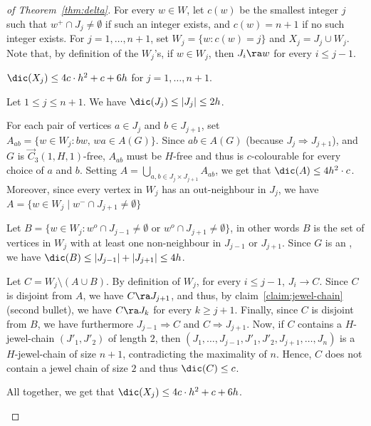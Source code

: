 \begin{proof}[of Theorem~\ref{thm:delta}]
For every $w \in W$, let $c(w)$ be the smallest integer $j$ such that $w^+\cap J_j \neq\emptyset$ if such an integer exists, and $c(w)=n+1$ if no such integer exists. 
For $j=1, \dots, n+1$, set $W_j = \{w:  c(w)=j\}$ and $X_j = J_j \cup W_j$. 
Note that, by definition of the $W_j$'s, if $w \in W_j$, then $J_i \ra w$ for every $i \leq j-1$. 
\vspace{0.3cm}

\begin{claim}\label{claim:X}
$\dic(X_j) \leq  4c \cdot h^2+ c + 6h $ for $j=1, \dots, n+1$. 
\end{claim}

\begin{subproof}
Let $1 \leq j \leq n+1$.
We have $\dic(J_j) \leq |J_j| \leq  2h$.  

 For each pair of vertices $a \in J_{j}$ and $b \in J_{j+1}$, 
set $A_{ab} = \{w \in W_j: bw, \, wa \in A(G)\}$. Since $ab \in A(G)$ (because $J_j \Rightarrow J_{j+1}$), and $G$ is $\vec C_{3}(1, H, 1)$-free, $A_{ab}$ must be $H$-free and thus is $c$-colourable for every choice of $a$ and $b$. 
Setting $A = \bigcup_{a,b \in J_j\times J_{j+1}} A_{ab}$, we get that $\dic(A) \leq 4 h^2 \cdot c$. Moreover, since every vertex in $W_j$ has an out-neighbour in $J_j$, we have $A = \{w \in W_j \mid w^- \cap J_{j+1} \neq \emptyset \}$


Let $B = \{w \in W_j: w^o \cap J_{j-1} \neq \emptyset \text{ or }w^o \cap J_{j+1} \neq \emptyset \}$, in other words $B$ is the set of vertices in $W_j$ with at least one non-neighbour in $J_{j-1}$ or $J_{j+1}$. Since $G$ is an \omg, we have $\dic(B) \leq |J_{j-1}| + |J_{j+1}| \leq  4h$. 

Let $C = W_j \setminus (A \cup B)$. By definition of $W_j$, for every $i \leq j-1$, $J_i \rightarrow C$. 
Since $C$ is disjoint from $A$, we have $C \ra J_{j+1}$, and thus, by claim~\ref{claim:jewel-chain} (second bullet), we have $C \ra J_k$ for every $k \geq j+1$. 
Finally, since $C$ is disjoint from $B$, we have furthermore $J_{j-1} \Rightarrow C$ and $C \Rightarrow J_{j+1}$.  
Now, if $C$ contains a $H$-jewel-chain $(J'_1,J'_2)$ of length $2$, then $(J_1, \dots, J_{j-1}, J'_1, J'_2, J_{j+1}, \dots, J_n)$ is a $H$-jewel-chain of size $n+1$, contradicting the maximality of $n$. Hence, $C$ does not contain a jewel chain of size $2$ and thus $\dic(C)\leq c$.

All together, we get that $\dic(X_j) \leq 4c \cdot h^2+ c + 6h$. 
\end{subproof}


\end{proof}
